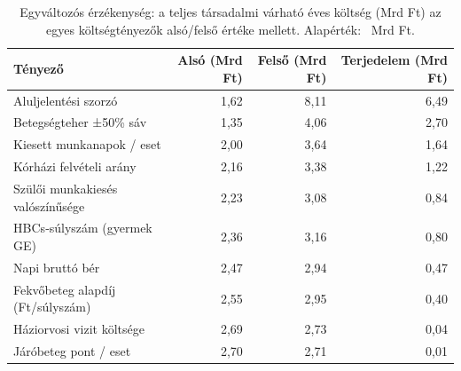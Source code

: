 \begin{table}[htbp]
\centering
\small
\begin{tabular}{p{5.4cm}rrr}
\toprule
Tényező & Alsó (Mrd Ft) & Felső (Mrd Ft) & Terjedelem (Mrd Ft) \\
\midrule
Aluljelentési szorzó & 1{,}62 & 8{,}11 & 6{,}49 \\
Betegségteher ±50\% sáv & 1{,}35 & 4{,}06 & 2{,}70 \\
Kiesett munkanapok / eset & 2{,}00 & 3{,}64 & 1{,}64 \\
Kórházi felvételi arány & 2{,}16 & 3{,}38 & 1{,}22 \\
Szülői munkakiesés valószínűsége & 2{,}23 & 3{,}08 & 0{,}84 \\
HBCs‑súlyszám (gyermek GE) & 2{,}36 & 3{,}16 & 0{,}80 \\
Napi bruttó bér & 2{,}47 & 2{,}94 & 0{,}47 \\
Fekvőbeteg alapdíj (Ft/súlyszám) & 2{,}55 & 2{,}95 & 0{,}40 \\
Háziorvosi vizit költsége & 2{,}69 & 2{,}73 & 0{,}04 \\
Járóbeteg pont / eset & 2{,}70 & 2{,}71 & 0{,}01 \\
\bottomrule
\end{tabular}
\caption{Egyváltozós érzékenység: a teljes társadalmi várható éves költség (Mrd Ft) az egyes költségtényezők alsó/felső értéke mellett. Alapérték: \baseCostMrd~Mrd Ft.}
\label{tab:tornado}
\end{table}
